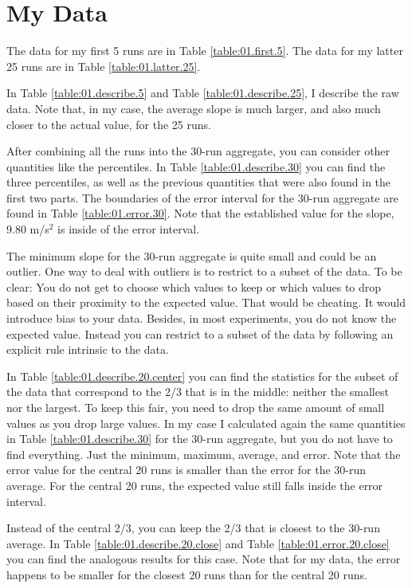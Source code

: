 \section{My Data}
The data for my first 5 runs are in Table \ref{table:01.first.5}. The data for my latter 25 runs are in Table \ref{table:01.latter.25}.

In Table \ref{table:01.describe.5} and Table \ref{table:01.describe.25}, I describe the raw data. Note that, in my case, the average slope is much larger, and also much closer to the actual value, for the 25 runs.

After combining all the runs into the 30-run aggregate, you can consider other quantities like the percentiles. In Table \ref{table:01.describe.30} you can find the three percentiles, as well as the previous quantities that were also found in the first two parts. The boundaries of the error interval for the 30-run aggregate are found in Table \ref{table:01.error.30}. Note that the established value for the slope, 9.80 m/s$^{2}$ is inside of the error interval.

The minimum slope for the 30-run aggregate is quite small and could be an outlier. One way to deal with outliers is to restrict to a subset of the data. To be clear: You do not get to choose which values to keep or which values to drop based on their proximity to the expected value. That would be cheating. It would introduce bias to your data. Besides, in most experiments, you do not know the expected value. Instead you can restrict to a subset of the data by following an explicit rule intrinsic to the data.

In Table \ref{table:01.describe.20.center} you can find the statistics for the subset of the data that correspond to the 2/3 that is in the middle: neither the smallest nor the largest. To keep this fair, you need to drop the same amount of small values as you drop large values. In my case I calculated again the same quantities in Table \ref{table:01.describe.30} for the 30-run aggregate, but you do not have to find everything. Just the minimum, maximum, average, and error. Note that the error value for the central 20 runs is smaller than the error for the 30-run average. For the central 20 runs, the expected value still falls inside the error interval.

Instead of the central 2/3, you can keep the 2/3 that is closest to the 30-run average. In Table \ref{table:01.describe.20.close} and Table \ref{table:01.error.20.close} you can find the analogous results for this case. Note that for my data, the error happens to be smaller for the closest 20 runs than for the central 20 runs.

